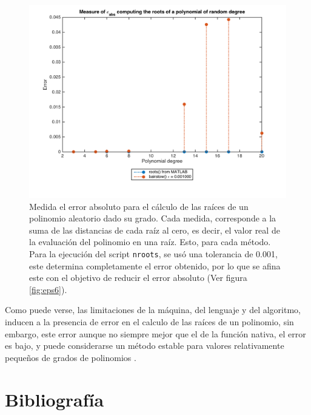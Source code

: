 \documentclass[11pt, spanish]{article}
\begin{document}
\begin{itemize}
\begin{figure}[h]
    \centering
    \includegraphics[width=15cm]{data/img/eps2}
    \caption{Medida el error absoluto para el cálculo de las raíces de un polinomio aleatorio dado su grado. Cada medida, corresponde a la suma de las distancias de cada raíz al cero, es decir, el valor real de la evaluación del polinomio en una raíz. Esto, para cada método. Para la ejecución del script \texttt{nroots}, se usó una tolerancia de 0.001, este determina completamente el error obtenido, por lo que se afina este con el objetivo de reducir el error absoluto (Ver figura \ref{fig:eps6}). }
    \label{fig:eps2}
\end{figure}

\newpage

Como puede verse, las limitaciones de la máquina, del lenguaje y del algoritmo, inducen a la presencia de error en el calculo de las raíces de un polinomio, sin embargo, este error aunque no siempre mejor que el de la función nativa, el error es bajo, y puede considerarse un método estable para valores relativamente pequeños de grados de polinomios .

\end{itemize}


\newpage
\section{Bibliografía}
\end{document}
